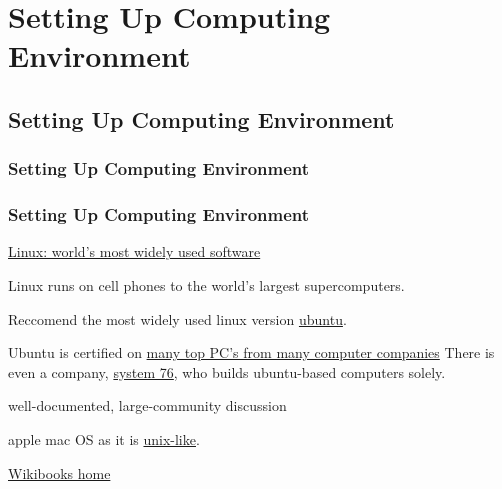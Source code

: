 \chapter{Setting Up Computing Environment}

\section{Setting Up Computing Environment}

\subsection{Setting Up Computing Environment}



\subsection{Setting Up Computing Environment}

\href{http://www.youtube.com/watch?v=7XTHdcmjenI}
{Linux: world's most widely used software}

Linux runs on cell phones to the world's largest supercomputers. 

Reccomend the most widely used linux version 
\href{http://www.ubuntu.com/}{ubuntu}.

Ubuntu is certified on 
\href{http://www.ubuntu.com/certification/}
{many top PC's from many computer companies}
There is even a company, \href{https://www.system76.com/}{system 76}, 
who builds ubuntu-based computers solely. 

well-documented, large-community discussion

apple mac OS as it is 
\href{https://en.wikipedia.org/wiki/Unix-like}{unix-like}.




\href{http://www.wikibooks.org}{Wikibooks home}

